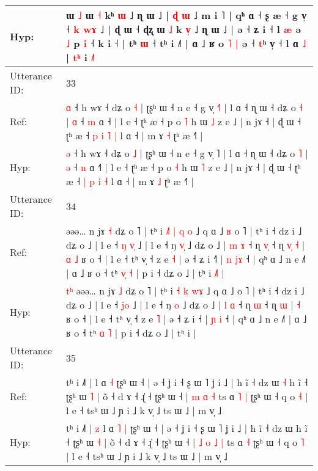 \documentclass[10pt]{article}
\DeclareRobustCommand{\hl}[1]{{\textcolor{red}{#1}}}
\begin{document}
\begin{longtable}{ll}
Hyp: & \hl{}\hl{}ɯ\hl{}\hl{} \hl{}\hl{˩} ɯ \hl{˧} kʰ \hl{ɯ} ˩ ɳ ɯ ˩ | \hl{ɖ} \hl{ɯ} ˩ m i \hl{}˥ | qʰ ɑ ˧ ʂ æ ˧ g v̩ ˧\hl{}\hl{}\hl{}\hl{}\hl{} \hl{k} \hl{}\hl{w}\hl{ɤ} ˩ | ɖ ɯ ˧ ɖʐ ɯ \hl{˩} k\hl{ }\hl{v}\hl{̩} ˩ ɳ ɯ ˩ | ə ˧ ʑ i ˧ l\hl{}\hl{}\hl{}\hl{} \hl{æ} ə \hl{˩} p\hl{} \hl{}\hl{i} ˧ k i ˧ | tʰ \hl{}\hl{ɯ} ˧\hl{}\hl{} tʰ i ˩˥ | ɑ ˩ ʁ o\hl{ }\hl{˥} \hl{|} ə ˧ \hl{t}ʰ v̩ ˧ l ɑ \hl{˩} |\hl{}\hl{} \hl{}\hl{t}\hl{ʰ} i\hl{}\hl{}\hl{}\hl{} \hl{}\hl{˩}˥\hl{}\hl{}
 \\
\midrule
Utterance ID: & 33 \\
Ref: & \hl{ɑ} ˧ h wɤ ˧ dʑ o \hl{˧} | ʈʂʰ ɯ ˧ n e ˧ g v̩ \hl{˧}˥ | l ɑ ˧ ɳ ɯ ˧ dʑ o \hl{˧} | \hl{ɑ} ˧ \hl{m} ɑ ˧\hl{} | l e ˧ ʈʰ æ ˧ p o \hl{˥} h ɯ \hl{˩} z e ˩ | n jɤ ˧ | ɖ ɯ ˧ ʈʰ æ ˧ \hl{p} \hl{i} \hl{˥} \hl{|} l ɑ ˧ | m ɤ \hl{˧} ʈʰ æ ˧˥ |
 \\
Hyp: & \hl{ə} ˧ h wɤ ˧ dʑ o \hl{˩} | ʈʂʰ ɯ ˧ n e ˧ g v̩ \hl{}˥ | l ɑ ˧ ɳ ɯ ˧ dʑ o \hl{˥} | \hl{ə} ˧ \hl{n} ɑ ˧\hl{˥} | l e ˧ ʈʰ æ ˧ p o \hl{˧} h ɯ \hl{˥} z e ˩ | n jɤ ˧ | ɖ ɯ ˧ ʈʰ æ ˧ \hl{|} \hl{p} \hl{i} \hl{˧} l ɑ ˧ | m ɤ \hl{˩} ʈʰ æ ˧˥ |
 \\
\midrule
Utterance ID: & 34 \\
Ref: & \hl{}\hl{}\hl{}əəə… n jɤ \hl{˧} dʑ o ˥ | tʰ i \hl{˩}\hl{˥} \hl{|} \hl{q}\hl{ }\hl{o} ˩ q ɑ ˩\hl{ }\hl{ʁ} o ˥ | tʰ i ˧ dz i ˩ dʑ o ˩ | l e ˧\hl{ }\hl{ŋ} \hl{v}\hl{̩} ˩ | l e ˧ ŋ \hl{v}\hl{̩} ˩ dʑ o ˩ | \hl{m} \hl{ɤ} ˧ ɳ \hl{v}\hl{̩} ˧ ɳ\hl{ }\hl{v}\hl{̩} \hl{˧} |\hl{ }\hl{ɑ} \hl{˩} ʁ o ˧ | l e ˧ tʰ v̩ ˧ z e \hl{˧} | ə ˧ ʑ i ˧\hl{˥} | \hl{n} \hl{j}\hl{ɤ} ˧ | qʰ ɑ ˩ n e ˩˥ | ɑ ˩ ʁ o ˧ tʰ \hl{v}\hl{̩} \hl{˧} | p i ˧ dʑ o ˩ | tʰ i\hl{ }\hl{˩}\hl{˥} |
 \\
Hyp: & \hl{t}\hl{ʰ}\hl{ }əəə… n jɤ \hl{˩} dʑ o ˥ | tʰ i \hl{}\hl{˧} \hl{k} \hl{}\hl{w}\hl{ɤ} ˩ q ɑ ˩\hl{}\hl{} o ˥ | tʰ i ˧ dz i ˩ dʑ o ˩ | l e ˧\hl{}\hl{} \hl{j}\hl{o} ˩ | l e ˧ ŋ \hl{}\hl{o} ˩ dʑ o ˩ | \hl{l} \hl{ɑ} ˧ ɳ \hl{}\hl{ɯ} ˧ ɳ\hl{}\hl{}\hl{} \hl{ɯ} |\hl{}\hl{} \hl{˧} ʁ o ˧ | l e ˧ tʰ v̩ ˧ z e \hl{˥} | ə ˧ ʑ i ˧\hl{} | \hl{ɲ} \hl{}\hl{i} ˧ | qʰ ɑ ˩ n e ˩˥ | ɑ ˩ ʁ o ˧ tʰ \hl{}\hl{ɑ} \hl{˥} | p i ˧ dʑ o ˩ | tʰ i\hl{}\hl{}\hl{} |
 \\
\midrule
Utterance ID: & 35 \\
Ref: & tʰ i ˩˥ |\hl{}\hl{} l ɑ\hl{}\hl{} \hl{˧} ʈʂʰ ɯ ˧ | ə ˧ ʝ i ˧ ʂ ɯ ˥ ʝ i ˩ | h ĩ ˧ dz ɯ\hl{ }\hl{˧} h ĩ ˧ ʈʂʰ ɯ \hl{˥} | õ ˧ d ɤ ˧ ɻ̍ ˧ ʈʂʰ ɯ ˧ |\hl{}\hl{} \hl{m} \hl{ɑ} \hl{˧} ts ɑ\hl{ }\hl{˥} \hl{|} ʈʂʰ ɯ ˧ q o \hl{˧} | l e ˧ tsʰ ɯ ˩ ɲ i ˩ k v̩ ˩ ts ɯ ˩ | m v̩ ˩
 \\
Hyp: & tʰ i ˩˥ |\hl{ }\hl{z} l ɑ\hl{ }\hl{˥} \hl{|} ʈʂʰ ɯ ˧ | ə ˧ ʝ i ˧ ʂ ɯ ˥ ʝ i ˩ | h ĩ ˧ dz ɯ\hl{}\hl{} h ĩ ˧ ʈʂʰ ɯ \hl{˧} | õ ˧ d ɤ ˧ ɻ̍ ˧ ʈʂʰ ɯ ˧ |\hl{ }\hl{˩} \hl{o} \hl{˩} \hl{|} ts ɑ\hl{}\hl{} \hl{˧} ʈʂʰ ɯ ˧ q o \hl{˥} | l e ˧ tsʰ ɯ ˩ ɲ i ˩ k v̩ ˩ ts ɯ ˩ | m v̩ ˩

\end{longtable}
\end{document}

